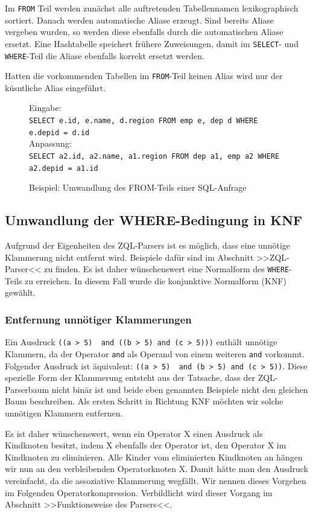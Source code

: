 Im \verb|FROM| Teil werden zunächst alle auftretenden Tabellennamen lexikographisch sortiert. Danach werden automatische Aliase erzeugt. Sind bereits Aliase vergeben wurden, so werden diese ebenfalls durch die automatischen Aliase ersetzt. Eine Hashtabelle speichert frühere Zuweisungen, damit im \verb|SELECT|- und \verb|WHERE|-Teil die Aliase ebenfalls korrekt ersetzt werden.

Hatten die vorkommenden Tabellen im \verb|FROM|-Teil keinen Alias wird nur der küsntliche Alias eingeführt.

\begin{figure}
Eingabe: \\\verb|SELECT e.id, e.name, d.region FROM emp e, dep d WHERE e.depid = d.id|\\

Anpassung: \\\verb|SELECT a2.id, a2.name, a1.region FROM dep a1, emp a2 WHERE a2.depid = a1.id|\\
\caption{Beispiel: Umwandlung des FROM-Teils einer SQL-Anfrage}
\end{figure}

\subsection{Umwandlung der WHERE-Bedingung in KNF}

Aufgrund der Eigenheiten des ZQL-Parsers ist es möglich, dass eine unnötige Klammerung nicht entfernt wird. Beispiele dafür sind im Abschnitt >>ZQL-Parser<< zu finden. Es ist daher wünschenswert eine Normalform des \verb|WHERE|-Teils zu erreichen. In diesem Fall wurde die konjunktive Normalform (KNF) gewählt.


\subsubsection{Entfernung unnötiger Klammerungen}

Ein Ausdruck \verb|((a > 5)  and ((b > 5) and (c > 5)))| enthält unnötige Klammern, da der Operator \verb|and| als Operand von einem weiteren \verb|and| vorkommt. Folgender Ausdruck ist äquivalent: \verb|((a > 5)  and (b > 5) and (c > 5))|. Diese spezielle Form der Klammerung entsteht aus der Tatsache, dass der ZQL-Parserbaum nicht binär ist und beide eben genannten Beispiele nicht den gleichen Baum beschreiben. Als ersten Schritt in Richtung KNF möchten wir solche unnötigen Klammern entfernen. 

Es ist daher wünschenswert, wenn ein Operator X einen Ausdruck als Kindknoten besitzt, indem X ebenfalls der Operator ist, den Operator X im Kindknoten zu eliminieren. Alle Kinder vom eliminierten Kindknoten an hängen wir nun an den verbleibenden Operatorknoten X. Damit hätte man den Ausdruck vereinfacht, da die assoziative Klammerung wegfällt. Wir nennen dieses Vorgehen im Folgenden Operatorkompression. Verbildlicht wird dieser Vorgang im Abschnitt >>Funktionsweise des Parsers<<.

